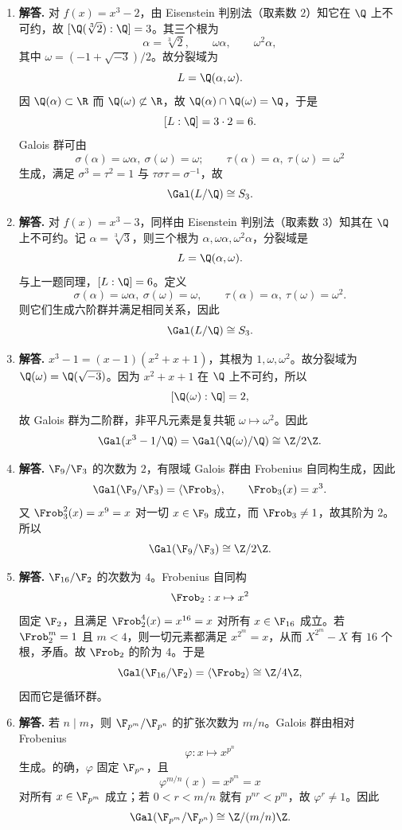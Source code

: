 \begin{enumerate}[label=\textbf{\arabic*.}, leftmargin=*, itemsep=1em]
\item \textbf{解答.} 对 $f(x)=x^3-2$，由 Eisenstein 判别法（取素数 $2$）知它在 $\Q$ 上不可约，故 $[\Q(\sqrt[3]{2}):\Q]=3$。其三个根为
\[
\alpha=\sqrt[3]{2},\qquad \omega\alpha,\qquad \omega^2\alpha,
\]
其中 $\omega=(-1+\sqrt{-3})/2$。故分裂域为
\[
L=\Q(\alpha,\omega).
\]
因 $\Q(\alpha)\subset \R$ 而 $\Q(\omega)\not\subset \R$，故 $\Q(\alpha)\cap\Q(\omega)=\Q$，于是
\[
[L:\Q]=3\cdot2=6.
\]
Galois 群可由
\[
\sigma(\alpha)=\omega\alpha,\ \sigma(\omega)=\omega;
\qquad
\tau(\alpha)=\alpha,\ \tau(\omega)=\omega^2
\]
生成，满足 $\sigma^3=\tau^2=1$ 与 $\tau\sigma\tau=\sigma^{-1}$，故
\[
\Gal(L/\Q)\cong S_3.
\]

\item \textbf{解答.} 对 $f(x)=x^3-3$，同样由 Eisenstein 判别法（取素数 $3$）知其在 $\Q$ 上不可约。记 $\alpha=\sqrt[3]{3}$，则三个根为 $\alpha,\omega\alpha,\omega^2\alpha$，分裂域是
\[
L=\Q(\alpha,\omega).
\]
与上一题同理，$[L:\Q]=6$。定义
\[
\sigma(\alpha)=\omega\alpha,\ \sigma(\omega)=\omega,
\qquad
\tau(\alpha)=\alpha,\ \tau(\omega)=\omega^2.
\]
则它们生成六阶群并满足相同关系，因此
\[
\Gal(L/\Q)\cong S_3.
\]

\item \textbf{解答.} $x^3-1=(x-1)(x^2+x+1)$，其根为 $1,\omega,\omega^2$。故分裂域为 $\Q(\omega)=\Q(\sqrt{-3})$。因为 $x^2+x+1$ 在 $\Q$ 上不可约，所以
\[
[\Q(\omega):\Q]=2,
\]
故 Galois 群为二阶群，非平凡元素是复共轭 $\omega\mapsto\omega^2$。因此
\[
\Gal(x^3-1/\Q)=\Gal(\Q(\omega)/\Q)\cong \Z/2\Z.
\]

\item \textbf{解答.} $\F_9/\F_3$ 的次数为 $2$，有限域 Galois 群由 Frobenius 自同构生成，因此
\[
\Gal(\F_9/\F_3)=\langle \Frob_3\rangle,
\qquad \Frob_3(x)=x^3.
\]
又 $\Frob_3^2(x)=x^9=x$ 对一切 $x\in\F_9$ 成立，而 $\Frob_3\neq 1$，故其阶为 $2$。所以
\[
\Gal(\F_9/\F_3)\cong \Z/2\Z.
\]

\item \textbf{解答.} $\F_{16}/\F_2$ 的次数为 $4$。Frobenius 自同构
\[
\Frob_2:x\mapsto x^2
\]
固定 $\F_2$，且满足 $\Frob_2^4(x)=x^{16}=x$ 对所有 $x\in\F_{16}$ 成立。若 $\Frob_2^m=1$ 且 $m<4$，则一切元素都满足 $x^{2^m}=x$，从而 $X^{2^m}-X$ 有 $16$ 个根，矛盾。故 $\Frob_2$ 的阶为 $4$。于是
\[
\Gal(\F_{16}/\F_2)=\langle\Frob_2\rangle\cong \Z/4\Z,
\]
因而它是循环群。

\item \textbf{解答.} 若 $n\mid m$，则 $\F_{p^m}/\F_{p^n}$ 的扩张次数为 $m/n$。Galois 群由相对 Frobenius
\[
\varphi:x\mapsto x^{p^n}
\]
生成。的确，$\varphi$ 固定 $\F_{p^n}$，且
\[
\varphi^{m/n}(x)=x^{p^m}=x
\]
对所有 $x\in\F_{p^m}$ 成立；若 $0<r<m/n$ 就有 $p^{nr}<p^m$，故 $\varphi^r\neq 1$。因此
\[
\Gal(\F_{p^m}/\F_{p^n})\cong \Z/(m/n)\Z.
\]


\end{enumerate}
